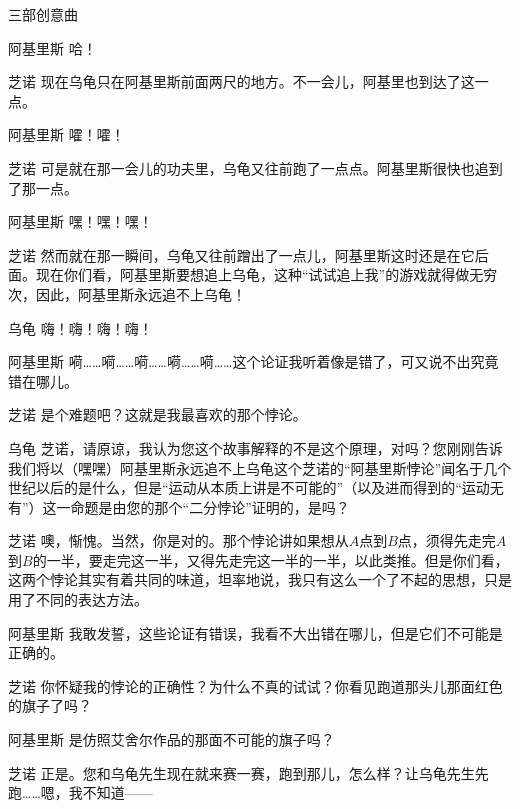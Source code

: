 \begin{dialog}{三部创意曲}
\begin{dialogue}
\item[阿基里斯]哈！

\item[芝诺]现在乌龟只在阿基里斯前面两尺的地方。不一会儿，阿基里也到达了这一点。

\item[阿基里斯]嚯！嚯！

\item[芝诺]可是就在那一会儿的功夫里，乌龟又往前跑了一点点。阿基里斯很快也追到了那一点。

\item[阿基里斯]嘿！嘿！嘿！

\item[芝诺]然而就在那一瞬间，乌龟又往前蹭出了一点儿，阿基里斯这时还是在它后面。现在你们看，阿基里斯要想追上乌龟，这种“试试追上我”的游戏就得做无穷次，因此，阿基里斯永远追不上乌龟！

\item[乌龟]嗨！嗨！嗨！嗨！

\item[阿基里斯]嗬……嗬……嗬……嗬……嗬……这个论证我听着像是错了，可又说不出究竟错在哪儿。

\item[芝诺]是个难题吧？这就是我最喜欢的那个悖论。

\item[乌龟]芝诺，请原谅，我认为您这个故事解释的不是这个原理，对吗？您刚刚告诉我们将以（嘿嘿）阿基里斯永远追不上乌龟这个芝诺的“阿基里斯悖论”闻名于几个世纪以后的是什么，但是“运动从本质上讲是不可能的”（以及进而得到的“运动无有”）这一命题是由您的那个“二分悖论”证明的，是吗？

\item[芝诺]噢，惭愧。当然，你是对的。那个悖论讲如果想从$A$点到$B$点，须得先走完$A$到$B$的一半，要走完这一半，又得先走完这一半的一半，以此类推。但是你们看，这两个悖论其实有着共同的味道，坦率地说，我只有这么一个了不起的思想，只是用了不同的表达方法。

\item[阿基里斯]我敢发誓，这些论证有错误，我看不大出错在哪儿，但是它们不可能是正确的。

\item[芝诺]你怀疑我的悖论的正确性？为什么不真的试试？你看见跑道那头儿那面红色的旗子了吗？

\item[阿基里斯]是仿照艾舍尔作品的那面不可能的旗子吗？

\item[芝诺]正是。您和乌龟先生现在就来赛一赛，跑到那儿，怎么样？让乌龟先生先跑……嗯，我不知道——


\end{dialogue}
\end{dialog}
